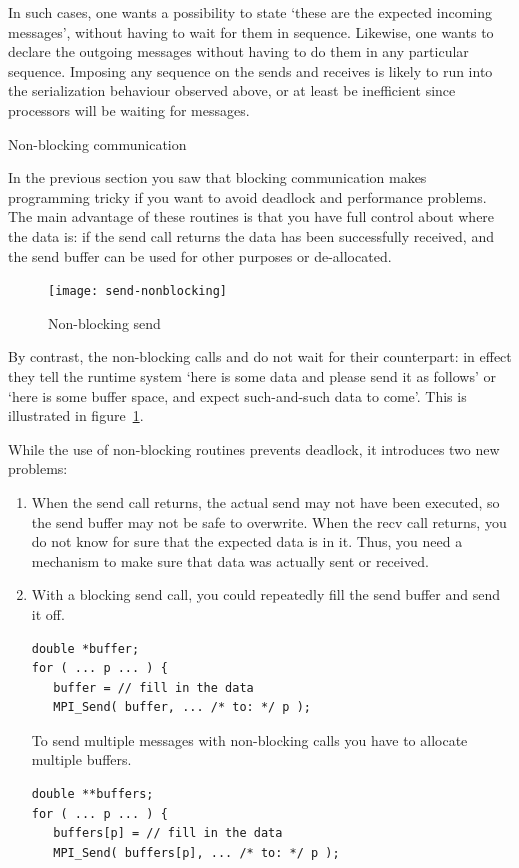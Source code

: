In such cases, one wants a possibility to state `these are the expected incoming
messages', without having to wait for them in sequence. Likewise, one wants to declare
the outgoing messages without having to do them in any particular sequence.
Imposing any sequence on the sends and receives is likely to run into the serialization
behaviour observed above, or at least be inefficient since processors will be
waiting for messages.

 {Non-blocking communication}
\label{sec:nonblocking}

In the previous section you saw that blocking communication makes
programming tricky if you want to avoid deadlock and performance
problems. The main advantage of these routines is that you have full
control about where the data is: if the send call returns
the data has been successfully received, and the send buffer can be used for
other purposes or de-allocated.  

\begin{figure}[ht]
  \texttt{[image: send-nonblocking]}
  \caption{Non-blocking send}
  \label{fig:send-nonblocking}
\end{figure}

By contrast, the non-blocking calls  and
 do not wait for their counterpart: in effect
they tell the runtime system `here is some data and please send it as
follows' or `here is some buffer space, and expect such-and-such data
to come'.  This is illustrated in figure~\ref{fig:send-nonblocking}.



While the use of non-blocking routines prevents deadlock, it
introduces two new problems:
\begin{enumerate}
\item When the send call returns, the actual send may not have been executed,
  so the send buffer may not be safe to
  overwrite. When the recv call returns, you do not know for sure that
  the expected data is in it. Thus, you need a mechanism to make sure
  that data was actually sent or received.
\item With a blocking send call, you could repeatedly fill the send
  buffer and send it off.
\begin{lstlisting}
double *buffer;
for ( ... p ... ) {
   buffer = // fill in the data
   MPI_Send( buffer, ... /* to: */ p );
\end{lstlisting}
  To send multiple messages with non-blocking calls
  you have to allocate multiple buffers.
\begin{lstlisting}
double **buffers;
for ( ... p ... ) {
   buffers[p] = // fill in the data
   MPI_Send( buffers[p], ... /* to: */ p );
\end{lstlisting}
\end{enumerate}


